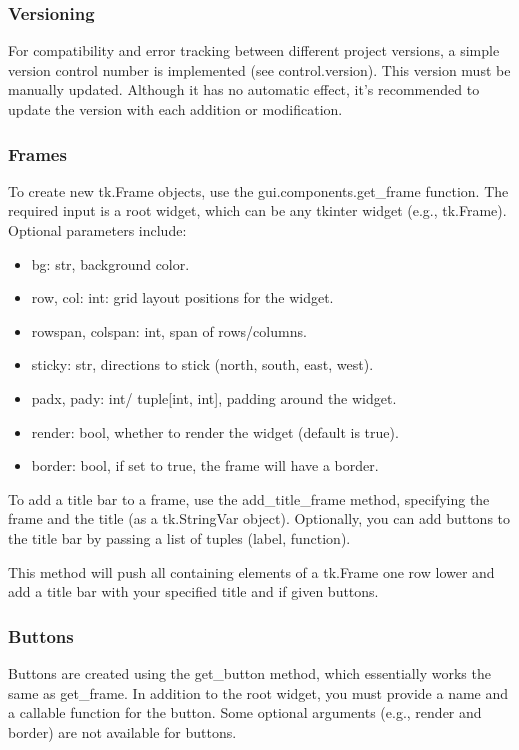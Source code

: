 \documentclass{article}
\begin{document}
\subsubsection{Versioning}
For compatibility and error tracking between different project versions, a simple version control number is implemented (see control.version). This version must be manually updated. Although it has no automatic effect, it's recommended to update the version with each addition or modification.

\subsubsection{Frames}
To create new tk.Frame objects, use the gui.components.get\_frame function. The required input is a root widget, which can be any tkinter widget (e.g., tk.Frame). Optional parameters include:
\begin{itemize}
    \item bg: str, background color.
    \item row, col: int: grid layout positions for the widget.
    \item rowspan, colspan: int, span of rows/columns.
    \item sticky: str, directions to stick (north, south, east, west).
    \item padx, pady: int/ tuple[int, int], padding around the widget.
    \item render: bool, whether to render the widget (default is true).
    \item border: bool, if set to true, the frame will have a border.
\end{itemize}

To add a title bar to a frame, use the add\_title\_frame method, specifying the frame and the title (as a tk.StringVar object). Optionally, you can add buttons to the title bar by passing a list of tuples (label, function).

This method will push all containing elements of a tk.Frame one row lower and add a title bar with your specified title and if given buttons.

\subsubsection{Buttons}
Buttons are created using the get\_button method, which essentially works the same as get\_frame. In addition to the root widget, you must provide a name and a callable function for the button. Some optional arguments (e.g., render and border) are not available for buttons.
\end{document}
